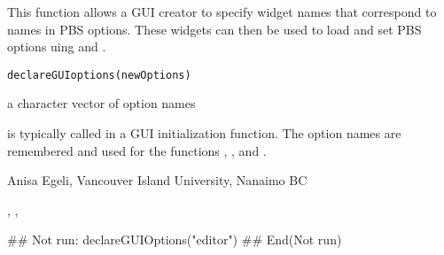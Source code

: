 \documentclass[letterpaper]{book}
\begin{document}
\begin{Description}\relax
This function allows a GUI creator to specify widget names that 
correspond to names in PBS options. These widgets can then be 
used to load and set PBS options uing  and 
.
\end{Description}
\begin{Usage}
\begin{verbatim}
declareGUIoptions(newOptions)
\end{verbatim}
\end{Usage}
\begin{Arguments}
\begin{ldescription}
\item[\code{newOptions}] a character vector of option names
\end{ldescription}
\end{Arguments}
\begin{Details}\relax
{} is typically called in a GUI initialization function.
The option names are remembered and used for the functions 
, , and .
\end{Details}
\begin{Author}\relax
Anisa Egeli, Vancouver Island University, Nanaimo BC
\end{Author}
\begin{SeeAlso}\relax
{}, ,
\end{SeeAlso}
\begin{Examples}
\begin{ExampleCode}
## Not run: 
declareGUIOptions("editor")
## End(Not run)
\end{ExampleCode}
\end{Examples}
\end{document}
